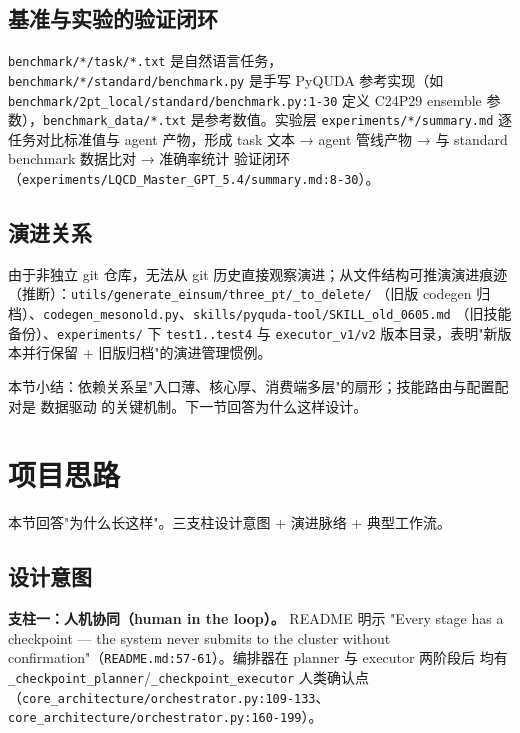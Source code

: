 \documentclass[UTF8]{ctexart}
\begin{document}
\subsection{基准与实验的验证闭环}

\texttt{benchmark/*/task/*.txt} 是自然语言任务，\texttt{benchmark/*/standard/benchmark.py}
是手写 PyQUDA 参考实现（如 \texttt{\nolinkurl{benchmark/2pt_local/standard/benchmark.py:1-30}}
定义 C24P29 ensemble 参数），\texttt{benchmark\_data/*.txt} 是参考数值。实验层
\texttt{experiments/*/summary.md} 逐任务对比标准值与 agent 产物，形成
\textcolor{relation}{task 文本 → agent 管线产物 → 与 standard benchmark 数据比对 → 准确率统计}
验证闭环（\texttt{\nolinkurl{experiments/LQCD_Master_GPT_5.4/summary.md:8-30}}）。

\subsection{演进关系}

由于非独立 git 仓库，无法从 git 历史直接观察演进；从文件结构可推演演进痕迹
（\textcolor{relation}{推断}）：\texttt{utils/generate\_einsum/three\_pt/\_to\_delete/}
（旧版 codegen 归档）、\texttt{codegen\_mesonold.py}、\texttt{skills/pyquda-tool/SKILL\_old\_0605.md}
（旧技能备份）、\texttt{experiments/} 下 \texttt{test1..test4} 与 \texttt{executor\_v1/v2}
版本目录，表明"新版本并行保留 + 旧版归档"的演进管理惯例。

本节小结：依赖关系呈"入口薄、核心厚、消费端多层"的扇形；技能路由与配置配对是
\textcolor{relation}{数据驱动} 的关键机制。下一节回答为什么这样设计。

\section{项目思路}

本节回答"为什么长这样"。三支柱设计意图 + 演进脉络 + 典型工作流。

\subsection{设计意图}

\textbf{支柱一：人机协同（human in the loop）。} README 明示
"Every stage has a checkpoint — the system never submits to the cluster without
confirmation"（\texttt{\nolinkurl{README.md:57-61}}）。编排器在 planner 与 executor 两阶段后
均有 \texttt{\_checkpoint\_planner}/\texttt{\_checkpoint\_executor} 人类确认点
（\texttt{\nolinkurl{core_architecture/orchestrator.py:109-133}}、\texttt{\nolinkurl{core_architecture/orchestrator.py:160-199}}）。
\end{document}
